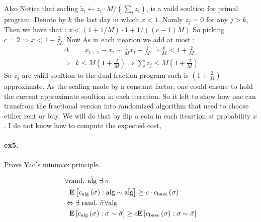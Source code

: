 \documentclass{article}
\begin{document}
\begin{multicols*}{2}
Also Notice that sacling $\tilde{z}_{i} \leftarrow z_{i} \cdot M / \left( \sum_{i}z_{i}  \right)$, is a vaild soultion for primal program. Denote by $k$ the last day in which  $x < 1$. Namly $z_{j} = 0 $ for any $j > k$, Then we have that :  $x < \left( 1 + 1/M  \right)\cdot 1 + 1 / \left( \left( c-1 \right)M \right) $ So picking $c = 2 \Rightarrow x < 1 + \frac{2}{M}$.
  Now As in each itearion we add at most : 
  \begin{equation*}
    \begin{split}
      \Delta  & = x_{t+1} - x_{t} \sim \frac{1}{M} x_{t} + \frac{1}{M} \Rightarrow \frac{k}{M} < 1+ \frac{2}{M} \\
      \Rightarrow & k \le M\left( 1 + \frac{2}{M} \right) \Rightarrow \sum{z_{j}}\le M\left( 1 + \frac{2}{M} \right)
    \end{split}
  \end{equation*}
So $\tilde{z_{j}}$ are valid soultion to the dual fraction program such is $ \left( 1 + \frac{2}{M} \right)$ approximate. As the scaling made by a constant factor, one could ensure to hold the current approximate soultion in each iteration.   
So it left to show how one can transfrom the fractional version into randomized algorithm that need to choose etiher rent or buy. We will do that by flip a coin in each iteartion at probability $x$. I do not know how to compute the expected cost, 
  \paragraph{ex5.} Prove Yao's minimax principle. 

  \begin{equation*}
    \begin{split}
      & \forall \text{rand. } \tilde{\text{alg}} \  \exists  \ \sigma  \\
      & \ \ \dalg{ \calg\left( \sigma \right) } \ge c \cdot   \cbase\left( \sigma \right) \\  
      & \Leftrightarrow \exists \ \text{rand.} \ \tilde{\sigma} \forall \text{alg} \\  
      & \ \ \dsig{  \calg\left( \sigma \right)  } \ge c \dsig{ \cbase \left( \sigma \right)  } 
    \end{split}
  \end{equation*}

\end{multicols*}
\end{document}

